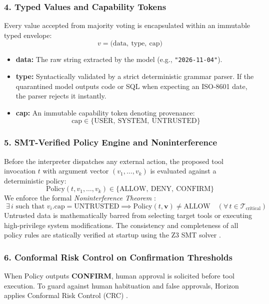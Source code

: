 \subsubsection{4. Typed Values and Capability Tokens}
Every value accepted from majority voting is encapsulated within an immutable typed envelope:
\begin{equation}
    v = \big(\text{data}, \ \text{type}, \ \text{cap}\big)
\end{equation}
\begin{itemize}
    \item \textbf{data:} The raw string extracted by the model (e.g., \texttt{"2026-11-04"}).
    \item \textbf{type:} Syntactically validated by a strict deterministic grammar parser. If the quarantined model outputs code or SQL when expecting an ISO-8601 date, the parser rejects it instantly.
    \item \textbf{cap:} An immutable capability token denoting provenance:
    \begin{equation}
        \text{cap} \in \{\text{USER},\ \text{SYSTEM},\ \text{UNTRUSTED}\}
    \end{equation}
\end{itemize}

\subsubsection{5. SMT-Verified Policy Engine and Noninterference}
Before the interpreter dispatches any external action, the proposed tool invocation $t$ with argument vector $(v_1, \dots, v_k)$ is evaluated against a deterministic policy:
\begin{equation}
    \mathrm{Policy}(t, v_1, \dots, v_k) \in \{\text{ALLOW},\ \text{DENY},\ \text{CONFIRM}\}
\end{equation}
We enforce the formal \emph{Noninterference Theorem} \cite{goguen1982}:
\begin{equation}
    \boxed{\;
    \exists\, i \text{ such that } v_i.\text{cap} = \text{UNTRUSTED} \implies \mathrm{Policy}(t, \mathbf{v}) \neq \text{ALLOW} \quad (\forall\, t \in \mathcal{T}_{\mathrm{critical}}) \;}
\end{equation}
Untrusted data is mathematically barred from selecting target tools or executing high-privilege system modifications. The consistency and completeness of all policy rules are statically verified at startup using the Z3 SMT solver \cite{demoura2008z3}.

\subsubsection{6. Conformal Risk Control on Confirmation Thresholds}
When $\mathrm{Policy}$ outputs \textbf{CONFIRM}, human approval is solicited before tool execution. To guard against human habituation and false approvals, Horizon applies Conformal Risk Control (CRC) \cite{angelopoulos2024crc}.

